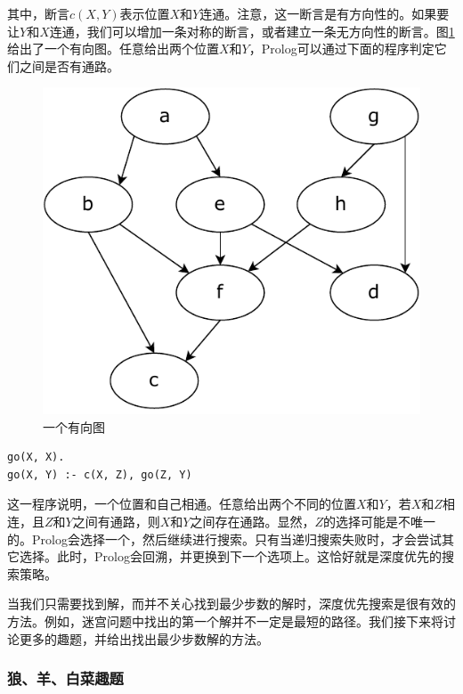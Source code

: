 \documentclass[b5paper]{ctexart}
\begin{document}
其中，断言$c(X, Y)$表示位置$X$和$Y$连通。注意，这一断言是有方向性的。如果要让$Y$和$X$连通，我们可以增加一条对称的断言，或者建立一条无方向性的断言。图\ref{fig:directed-graph}给出了一个有向图。任意给出两个位置$X$和$Y$，Prolog可以通过下面的程序判定它们之间是否有通路。

\begin{figure}[htbp]
 \centering
 \includegraphics[scale=0.5]{img/directed-graph}
 \caption{一个有向图}
 \label{fig:directed-graph}
\end{figure}

\lstset{language=Prolog}
\begin{lstlisting}
go(X, X).
go(X, Y) :- c(X, Z), go(Z, Y)
\end{lstlisting}

这一程序说明，一个位置和自己相通。任意给出两个不同的位置$X$和$Y$，若$X$和$Z$相连，且$Z$和$Y$之间有通路，则$X$和$Y$之间存在通路。显然，$Z$的选择可能是不唯一的。Prolog会选择一个，然后继续进行搜索。只有当递归搜索失败时，才会尝试其它选择。此时，Prolog会回溯，并更换到下一个选项上。这恰好就是深度优先的搜索策略。

当我们只需要找到解，而并不关心找到最少步数的解时，深度优先搜索是很有效的方法。例如，迷宫问题中找出的第一个解并不一定是最短的路径。我们接下来将讨论更多的趣题，并给出找出最少步数解的方法。

\subsubsection{狼、羊、白菜趣题}
\end{document}
